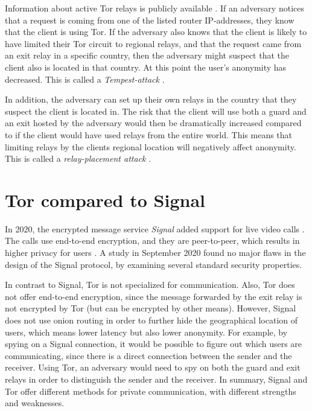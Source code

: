 \documentclass{kththesis}
\begin{document}
Information about active Tor relays is publicly available \parencite{TorRelaySearch}. If an adversary notices that a request is coming from one of the listed router IP-addresses, they know that the client is using Tor. If the adversary also knows that the client is likely to have limited their Tor circuit to regional relays, and that the request came from an exit relay in a specific country, then the adversary might suspect that the client also is located in that country. At this point the user's anonymity has decreased. This is called a \emph{Tempest-attack} \parencite{wails2018tempest}\parencite{CLAPS}.

In addition, the adversary can set up their own relays in the country that they suspect the client is located in. The risk that the client will use both a guard and an exit hosted by the adversary would then be dramatically increased compared to if the client would have used relays from the entire world. This means that limiting relays by the clients regional location will negatively affect anonymity. This is called a \emph{relay-placement attack} \parencite{guardPlacementAttacks}\parencite{CLAPS}.

\section{Tor compared to Signal}
In 2020, the encrypted message service \emph{Signal} added support for live video calls \parencite{signal}. The calls use end-to-end encryption, and they are peer-to-peer, which results in higher privacy for users \parencite{signalPeerToPeer}. A study \parencite{cohn2020formalsecurity} in September 2020 found no major flaws in the design of the Signal protocol, by examining several standard security properties. 

In contrast to Signal, Tor is not specialized for communication. Also, Tor does not offer end-to-end encryption, since the message forwarded by the exit relay is not encrypted by Tor (but can be encrypted by other means). However, Signal does not use onion routing in order to further hide the geographical location of users, which means lower latency but also lower anonymity. For example, by spying on a Signal connection, it would be possible to figure out which users are communicating, since there is a direct connection between the sender and the receiver. Using Tor, an adversary would need to spy on both the guard and exit relays in order to distinguish the sender and the receiver. In summary, Signal and Tor offer different methods for private communication, with different strengths and weaknesses.
\end{document}
